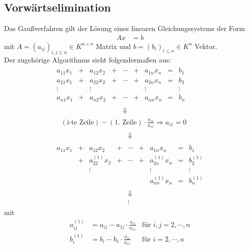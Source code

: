 \documentclass[ngerman,fontsize=11pt, paper=a4, parskip=half, titlepage=true, toc=bib]{scrbook}
\begin{document}
\subsection{Vorwärtselimination} \label{2.1.1}
Das Gaußverfahren gilt der Lösung eines linearen Gleichungssystems der Form
\begin{align*}
  Ax &= b
\end{align*}
mit $A=(a_{ij})_{i,j \leq n} \in K^{n\times n}$ Matrix und $b=(b_i)_{i\leq n} \in K^n$ Vektor.\\
Der zugehörige Algorithmus sieht folgendermaßen aus:
\begin{gather*}
  \begin{array}{ccccccccc}
    a_{11}x_1 &+& a_{12}x_2 &+& \cdots &+& a_{1n}x_n & = & b_1 ~~\\
    a_{21}x_1 &+& a_{22}x_2 &+& \cdots &+& a_{2n}x_n & = & b_2 \\
    \vdots         &&        \vdots     &&              &&   \vdots       &    & \vdots \\
    a_{n1}x_1 &+& a_{n2}x_2 &+& \cdots &+& a_{nn}x_n & = & b_n \\\\
              &&&& \Downarrow &&&& 
  \end{array} \\
  \quad	(\text{i-te Zeile}) - (\text{1. Zeile})\cdot \frac{a_{i1}}{a_{11}} \Rightarrow a_{i1}=0\\
  \begin{array}{ccccccccc}
    &&&& \Downarrow &&&&  \\\\
    a_{11}x_1 &+& a_{12}x_2 &+& \cdots &+& a_{1n}x_n & = & b_1 \\
    &+& a_{22}^{(1)}x_2 &+& \cdots &+& a_{2n}^{(1)}x_n & = & b_2^{(1)} \\
    &&        \vdots     &&              &&   \vdots       &    & \vdots \\
    && && && a_{nn}^{(1)}x_n & = & b_n^{(1)} \\\\
    &&&& \Downarrow &&&&\\
    &&&& \vdots &&&&
  \end{array} 
\end{gather*}
mit
\begin{align*}
  a_{ij}^{(1)} &= a_{ij}-a_{1j}\cdot \frac{a_{i1}}{a_{11}}
  & \text{für }i,j = 2, \cdots, n \\
  b_i^{(1)}      &= b_i- b_1\cdot \frac{a_{i1}}{a_{11}}
  & \text{für }i = 2, \cdots, n 
\end{align*}
\end{document}
